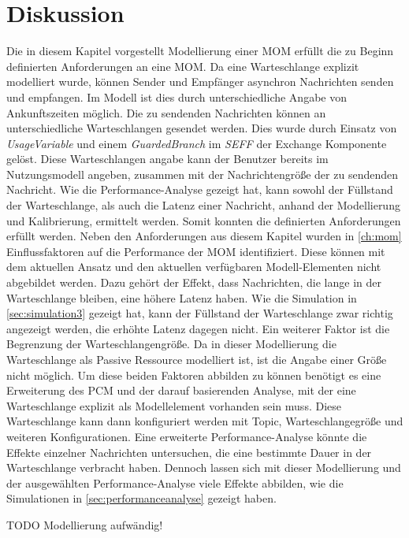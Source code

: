 \section{Diskussion}
Die in diesem Kapitel vorgestellt Modellierung einer MOM erfüllt die zu Beginn definierten Anforderungen an eine MOM. Da eine Warteschlange explizit modelliert wurde, können Sender und Empfänger asynchron Nachrichten senden und empfangen. Im Modell ist dies durch unterschiedliche Angabe von Ankunftszeiten möglich. Die zu sendenden Nachrichten können an unterschiedliche Warteschlangen gesendet werden. Dies wurde durch Einsatz von \emph{UsageVariable} und einem \emph{GuardedBranch} im \emph{SEFF} der Exchange Komponente gelöst. Diese Warteschlangen angabe kann der Benutzer bereits im Nutzungsmodell angeben, zusammen mit der Nachrichtengröße der zu sendenden Nachricht. Wie die Performance-Analyse gezeigt hat, kann sowohl der Füllstand der Warteschlange, als auch die Latenz einer Nachricht, anhand der Modellierung und Kalibrierung, ermittelt werden. Somit konnten die definierten Anforderungen erfüllt werden. Neben den Anforderungen aus diesem Kapitel wurden in \autoref{ch:mom} Einflussfaktoren auf die Performance der MOM identifiziert. Diese können mit dem aktuellen Ansatz und den aktuellen verfügbaren Modell-Elementen nicht abgebildet werden. Dazu gehört der Effekt, dass Nachrichten, die lange in der Warteschlange bleiben, eine höhere Latenz haben. Wie die Simulation in \autoref{sec:simulation3} gezeigt hat, kann der Füllstand der Warteschlange zwar richtig angezeigt werden, die erhöhte Latenz dagegen nicht. Ein weiterer Faktor ist die Begrenzung der Warteschlangengröße. Da in dieser Modellierung die Warteschlange als Passive Ressource modelliert ist, ist die Angabe einer Größe nicht möglich. Um diese beiden Faktoren abbilden zu können benötigt es eine Erweiterung des PCM und der darauf basierenden Analyse, mit der eine Warteschlange explizit als Modellelement vorhanden sein muss. Diese Warteschlange kann dann konfiguriert werden mit Topic, Warteschlangegröße und weiteren Konfigurationen. Eine erweiterte Performance-Analyse könnte die Effekte einzelner Nachrichten untersuchen, die eine bestimmte Dauer in der Warteschlange verbracht haben. Dennoch lassen sich mit dieser Modellierung und der ausgewählten Performance-Analyse viele Effekte abbilden, wie die Simulationen in \autoref{sec:performanceanalyse} gezeigt haben.

TODO Modellierung aufwändig!

